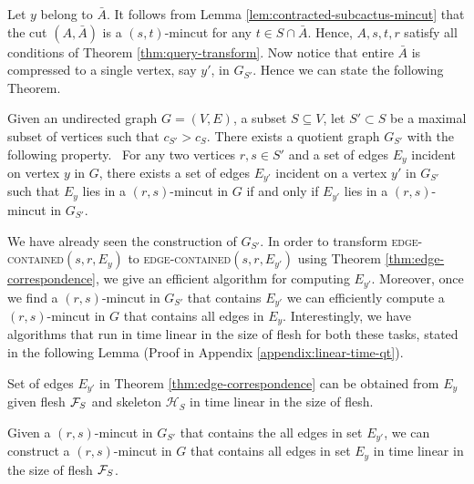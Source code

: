 Let $y$ belong to $\bar{A}$. It follows from Lemma \ref{lem:contracted-subcactus-mincut} that the cut $(A,\bar{A})$ is a $(s,t)$-mincut for any $t\in S\cap \bar{A}$. Hence, $A,s,t,r$ satisfy all conditions of Theorem  \ref{thm:query-transform}. Now notice that entire $\bar{A}$
is compressed to a single vertex, say $y'$, in $G_{S'}$. Hence we can state the following Theorem.



\begin{theorem} \label{thm:edge-correspondence}
Given an undirected graph $G=(V,E)$, a subset $S\subseteq V$, let $S'\subset S$ be a maximal subset of vertices such that $c_{S'}>c_S$.
There exists a quotient graph $G_{S'}$ with the following property.~
For any two vertices $r,s \in S'$ and a set of edges $E_y$ incident on vertex $y$ in $G$, there exists a set of edges $E_{y'}$ incident on a vertex $y'$ in $G_{S'}$ such that $E_y$ lies in a $(r,s)$-mincut in $G$ if and only if $E_{y'}$ lies in a $(r,s)$-mincut in $G_{S'}$. 
\end{theorem}

We have already seen the construction of $G_{S'}$. In order to transform  \textsc{edge-contained}$(s,r,E_y)$ to \textsc{edge-contained}$(s,r,E_{y'})$  using Theorem \ref{thm:edge-correspondence}, we give an efficient algorithm for computing $E_{y'}$. Moreover, once we find a $(r,s)$-mincut in $G_{S'}$ that contains $E_{y'}$ we can efficiently compute a $(r,s)$-mincut in $G$ that contains all edges in $E_{y}$. Interestingly, we have algorithms that run in time linear in the size of flesh for both these tasks, stated in the following Lemma (Proof in Appendix \ref{appendix:linear-time-qt}). 

\begin{lemma}
\label{lem:linear-time-qt}
Set of edges $E_{y'}$ in Theorem \ref{thm:edge-correspondence} can be obtained from $E_y$ given flesh ${\cal F}_S$ and skeleton $\mathcal H_S$ in time linear in the size of flesh.
\end{lemma}

\begin{lemma}
\label{lem:mincut-qt}
Given a $(r,s)$-mincut in $G_{S'}$ that contains the all edges in set $E_{y'}$, we can construct a $(r,s)$-mincut in $G$ that contains all edges in set $E_y$ in time linear in the size of flesh ${\cal F}_S$.
\end{lemma}
